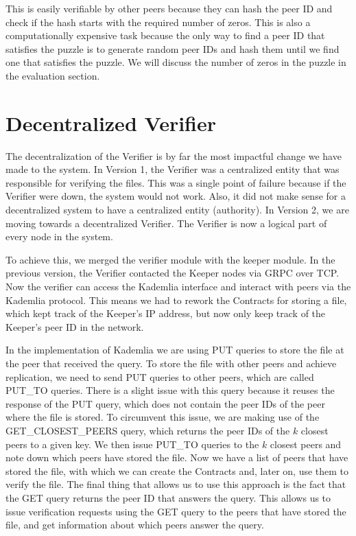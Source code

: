 This is easily verifiable by other peers because they can hash the peer ID and check if the hash starts with the required number of zeros.
This is also a computationally expensive task because the only way to find a peer ID that satisfies the puzzle is to generate random peer IDs and hash them until we find one that satisfies the puzzle.
We will discuss the number of zeros in the puzzle in the evaluation section.

\section{Decentralized Verifier}

The decentralization of the Verifier is by far the most impactful change we have made to the system.
In Version 1, the Verifier was a centralized entity that was responsible for verifying the files.
This was a single point of failure because if the Verifier were down, the system would not work.
Also, it did not make sense for a decentralized system to have a centralized entity (authority).
In Version 2, we are moving towards a decentralized Verifier.
The Verifier is now a logical part of every node in the system.

To achieve this, we merged the verifier module with the keeper module.
In the previous version, the Verifier contacted the Keeper nodes via GRPC over TCP.
Now the verifier can access the Kademlia interface and interact with peers via the Kademlia protocol.
This means we had to rework the Contracts for storing a file, which kept track of the Keeper's IP address,
but now only keep track of the Keeper's peer ID in the network.

In the implementation of Kademlia we are using PUT queries to store the file at the peer that received the query.
To store the file with other peers and achieve replication, we need to send PUT queries to other peers, which are called PUT\_TO queries.
There is a slight issue with this query because it reuses the response of the PUT query, which does not contain the peer IDs of the peer where the file is stored.
To circumvent this issue, we are making use of the GET\_CLOSEST\_PEERS query, which returns the peer IDs of the $k$ closest peers to a given key.
We then issue PUT\_TO queries to the $k$ closest peers and note down which peers have stored the file.
Now we have a list of peers that have stored the file, with which we can create the Contracts and, later on, use them to verify the file.
The final thing that allows us to use this approach is the fact that the GET query returns the peer ID that answers the query.
This allows us to issue verification requests using the GET query to the peers that have stored the file, and get information about which peers answer the query.
